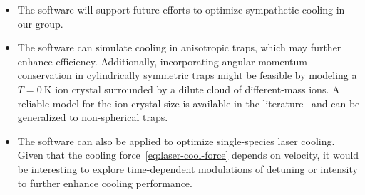 \begin{itemize}
  \item The software will support future efforts to optimize sympathetic cooling in our group.
  \item The software can simulate cooling in anisotropic traps, which may further enhance efficiency. Additionally, incorporating angular momentum conservation in cylindrically symmetric traps might be feasible by modeling a $T = 0\ \mathrm{K}$ ion crystal surrounded by a dilute cloud of different-mass ions. A reliable model for the ion crystal size is available in the literature~\cite{Madelung1991} and can be generalized to non-spherical traps.
  \item The software can also be applied to optimize single-species laser cooling. Given that the cooling force~\ref{eq:laser-cool-force} depends on velocity, it would be interesting to explore time-dependent modulations of detuning or intensity to further enhance cooling performance.
\end{itemize}
